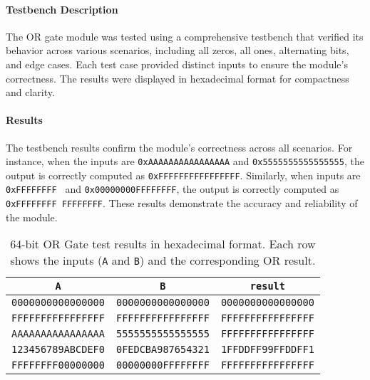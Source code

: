 \documentclass[12pt]{article}
\begin{document}
\paragraph{Testbench Description}
The OR gate module was tested using a comprehensive testbench that verified its behavior across various scenarios, including all zeros, all ones, alternating bits, and edge cases. Each test case provided distinct inputs to ensure the module's correctness. The results were displayed in hexadecimal format for compactness and clarity.

\paragraph{Results}
The testbench results confirm the module's correctness across all scenarios. For instance, when the inputs are \texttt{0xAAAAAAAAAAAAAAAA} and \texttt{0x5555555555555555}, the output is correctly computed as \texttt{0xFFFFFFFFFFFFFFFF}. Similarly, when inputs are \texttt{0xFFFFFFFF } and \texttt{0x00000000FFFFFFFF}, the output is correctly computed as \texttt{0xFFFFFFFF \break FFFFFFFF}. These results demonstrate the accuracy and reliability of the module.

\begin{table}[ht!]
    \centering
    \renewcommand{\arraystretch}{1.1}
    \setlength{\tabcolsep}{2pt}
    \begin{tabular}{|c|c|c|}
        \hline
        \textbf{\texttt{A}} & \textbf{\texttt{B}} & \textbf{\texttt{result}} \\
        \hline
        \texttt{0000000000000000} & \texttt{0000000000000000} & \texttt{0000000000000000} \\
        \texttt{FFFFFFFFFFFFFFFF} & \texttt{FFFFFFFFFFFFFFFF} & \texttt{FFFFFFFFFFFFFFFF} \\
        \texttt{AAAAAAAAAAAAAAAA} & \texttt{5555555555555555} & \texttt{FFFFFFFFFFFFFFFF} \\
        \texttt{123456789ABCDEF0} & \texttt{0FEDCBA987654321} & \texttt{1FFDDFF99FFDDFF1} \\
        \texttt{FFFFFFFF00000000} & \texttt{00000000FFFFFFFF} & \texttt{FFFFFFFFFFFFFFFF} \\
        \hline
    \end{tabular}
    \caption{64-bit OR Gate test results in hexadecimal format. Each row shows the inputs (\texttt{A} and \texttt{B}) and the corresponding OR result.}
    \label{tab:or_gate_results}
\end{table}
\end{document}
